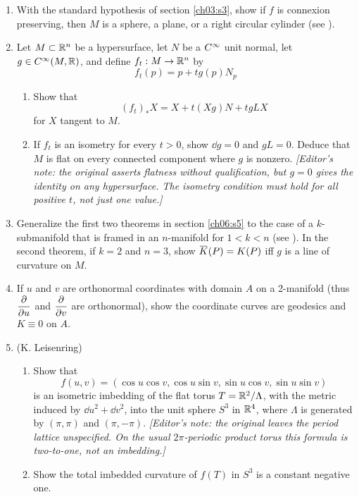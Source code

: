 \documentclass[../main]{subfiles}
\begin{document}
\begin{enumerate}
\item\label{pro:53} With the standard hypothesis of section \ref{ch03:s3}, show if $f$ is connexion preserving, then $M$ is a sphere, a plane, or a right circular cylinder (see \cite{hicks1963connection}).

\item\label{pro:54} Let $M\subset\mathbb{R}^n$ be a hypersurface, let $N$ be a $C^\infty$ unit normal, let $g\in C^\infty(M,\mathbb{R})$, and define $f_t:M\to\mathbb{R}^n$ by
\[f_t(p)=p+tg(p)N_p\]
\begin{enumerate}
    \item Show that
    \[(f_t)_*X = X + t(Xg)N + tgLX\]
    for $X$ tangent to $M$.
    \item If $f_t$ is an isometry for every $t>0$, show $\dd g=0$ and $gL=0$. Deduce that $M$ is flat on every connected component where $g$ is nonzero. \emph{[Editor's note: the original asserts flatness without qualification, but $g=0$ gives the identity on any hypersurface. The isometry condition must hold for all positive $t$, not just one value.]}
\end{enumerate}
 

\item\label{pro:55} Generalize the first two theorems in section \ref{ch06:s5} to the case of a $k$-submanifold that is framed in an $n$-manifold for $1<k<n$ (see \cite{hicks1963submanifolds}). In the second theorem, if $k=2$ and $n=3$, show $\xoverline K(P)=K(P)$ iff $g$ is a line of curvature on $M$.

\item\label{pro:56} If $u$ and $v$ are orthonormal coordinates with domain $A$ on a 2-manifold (thus $\dfrac{\partial }{\partial u}$ and $\dfrac{\partial }{\partial v}$ are orthonormal), show the coordinate curves are geodesics and $K\equiv0$ on $A$.

\item\label{pro:57} (K. Leisenring)
\begin{enumerate}[label=(\roman*)]
    \item Show that
\[f(u,v) = (\cos u\cos v,\cos u\sin v,\sin u\cos v,\sin u\sin v)\]
is an isometric imbedding of the flat torus $T=\mathbb{R}^2/\Lambda$, with the metric induced by $\dd u^2+\dd v^2$, into the unit sphere $S^3$ in $\mathbb{R}^4$, where $\Lambda$ is generated by $(\pi,\pi)$ and $(\pi,-\pi)$. \emph{[Editor's note: the original leaves the period lattice unspecified. On the usual $2\pi$-periodic product torus this formula is two-to-one, not an imbedding.]}
    \item  Show the total imbedded curvature of $f(T)$ in $S^3$ is a constant negative one.
\end{enumerate}



\end{enumerate}
\end{document}
